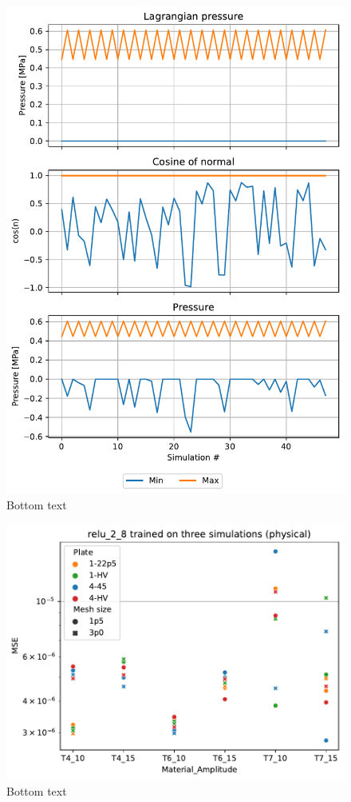 \begin{figure}
    \centering
    \includegraphics[width=\textwidth]{Chapter/05_results/figures/vars.pdf}
    \caption{Bottom text}
    \label{fig:para_vars}
\end{figure}

\begin{figure}
    \centering
    \includegraphics[width=\textwidth]{Chapter/05_results/figures/para5_all.pdf}
    \caption{Bottom text}
    \label{fig:para5_all}
\end{figure}

